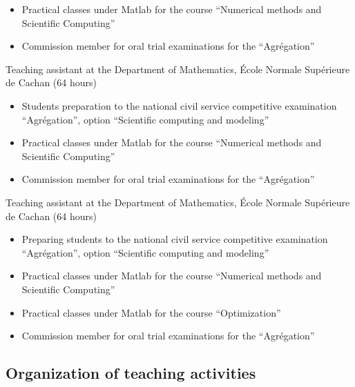 \documentclass[final, a4paper, oneside, 12pt]{article}
\numberwithin{equation}{section}
\begin{document}
\begin{description}
\begin{itemize}
    \item Practical classes under Matlab for the course ``Numerical methods and Scientific Computing''
    
    \item Commission member for oral trial examinations for the ``Agr\'egation''
  \end{itemize}
  
  \item[2006 -- 2007:] Teaching assistant at the Department of Mathematics, \'Ecole Normale Sup\'erieure de Cachan (64 hours)
  \begin{itemize}
    \item Students preparation to the national civil service competitive examination ``Agr\'egation'', option ``Scientific computing and modeling''
    
    \item Practical classes under Matlab for the course ``Numerical methods and Scientific Computing''
    
    \item Commission member for oral trial examinations for the ``Agr\'egation''
  \end{itemize}
  
  \item[2005 -- 2006:] Teaching assistant at the Department of Mathematics, \'Ecole Normale Sup\'erieure de Cachan (64 hours)
  \begin{itemize}
    \item Preparing students to the national civil service competitive examination ``Agr\'egation'', option ``Scientific computing and modeling''
    
    \item Practical classes under Matlab for the course ``Numerical methods and Scientific Computing''
    
    \item Practical classes under Matlab for the course ``Optimization''
    
    \item Commission member for oral trial examinations for the ``Agr\'egation''
  \end{itemize}
  
\end{description}

\subsection{Organization of teaching activities}
\end{document}

